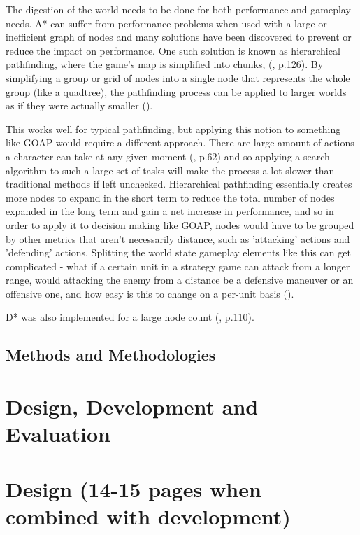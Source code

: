\documentclass[11pt, a4paper]{article}
\begin{document}
The digestion of the world needs to be done for both performance and gameplay needs. A* can suffer from performance problems when used with a large or inefficient graph of nodes and many solutions have been discovered to prevent or reduce the impact on performance. One such solution is known as hierarchical pathfinding, where the game's map is simplified into chunks, (\cite{cui2011based}, p.126). By simplifying a group or grid of nodes into a single node that represents the whole group (like a quadtree), the pathfinding process can be applied to larger worlds as if they were actually smaller (\cite{botea2004near}). 

This works well for typical pathfinding, but applying this notion to something like GOAP would require a different approach. There are large amount of actions a character can take at any given moment (\cite{nareyek2004ai}, p.62) and so applying a search algorithm to such a large set of tasks will make the process a lot slower than traditional methods if left unchecked. Hierarchical pathfinding essentially creates more nodes to expand in the short term to reduce the total number of nodes expanded in the long term and gain a net increase in performance, and so in order to apply it to decision making like GOAP, nodes would have to be grouped by other metrics that aren't necessarily distance, such as 'attacking' actions and 'defending' actions. Splitting the world state gameplay elements like this can get complicated - what if a certain unit in a strategy game can attack from a longer range, would attacking the enemy from a distance be a defensive maneuver or an offensive one, and how easy is this to change on a per-unit basis (\cite{weber2011building}).

D* was also implemented for a large node count (\cite{stentz1996map}, p.110).





\subsection{Methods and Methodologies}

\section {Design, Development and Evaluation}

\section{Design (14-15 pages when combined with development)}
\end{document}
